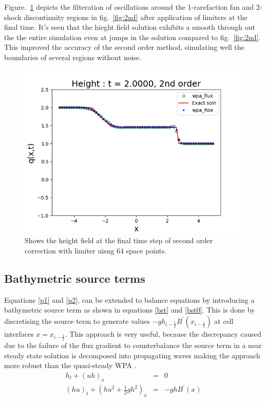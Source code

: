 \documentclass[12pt,a4paper]{article}
\begin{document}
\noindent Figure.~\ref{fig:2lim} depicts the filteration of oscillations around the 1-rarefaction fan and 2-shock discontinuity regions in fig.~\ref{fig:2nd} after application of limiters at the final time. It's seen that the hieght field solution exhibits a smooth through out the the entire simulation even at jumps in the solution compared to  fig.~\ref{fig:2nd}. This improved the accuracy of the second order method, simulating well the boundaries of several regions without noise.
\begin{figure}[H]
	\centering
	\includegraphics[width=0.85\linewidth]{images/2lim}
	\caption{Shows the height field at the final time step of second order correction with limiter uisng 64 space points.}
	\label{fig:2lim}
\end{figure}


	
	\subsection{ Bathymetric source terms}
	Equations \eqref{p1} and \eqref{p2}, can be extended to balance equations by introducing a bathymetric source term as shown in equations \eqref{bst} and  \eqref{bst0}. This is done by discretising the source term to generate values $-gh_{i-\frac{1}{2}}B^{\prime}(x_{i-\frac{1}{2}})$ at  cell interfaces  $x = x_{i-\frac{1}{2}}$. This approach is very useful, because the discrepancy caused due to the failure of the flux gradient to counterbalance the source term in a near steady state solution is decomposed into propagating waves  making the approach more robust than the quasi-steady WPA \cite{ba-le-mi-ro:2003}.
	\begin{eqnarray}
		h_{t} + (uh)_x &=& 0 
		\label{bst0}\\
		(hu)_t + \left(hu^{2} + \frac{1}{2}gh^{2} \right)_x &=& -ghB^{\prime}(x)
		\label{bst}
	\end{eqnarray}
	
\end{document}
